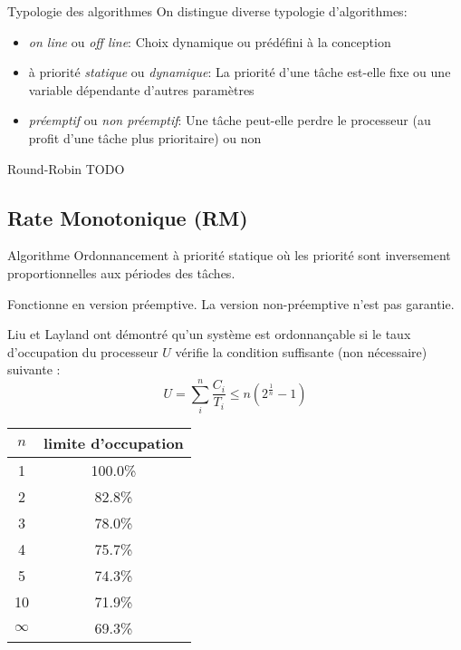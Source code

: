 \begin{frame}{Typologie des algorithmes}
  On distingue diverse typologie d'algorithmes:
  \begin{itemize}
  \item  \emph{on  line}  ou   \emph{off  line}:  Choix  dynamique  ou
    prédéfini à la conception
  \item  à priorité \emph{statique}  ou \emph{dynamique}:  La priorité
    d'une  tâche est-elle  fixe  ou une  variable dépendante  d'autres
    paramètres 
  \item \emph{préemptif} ou  \emph{non préemptif}: Une tâche peut-elle
    perdre le  processeur (au profit d'une tâche  plus prioritaire) ou
    non
  \end{itemize}
\end{frame}

\begin{frame}{Round-Robin}
TODO
\end{frame} 

\subsection{Rate Monotonique (RM)}

\begin{frame}{Algorithme}
  Ordonnancement à priorité statique où les priorité sont inversement
  proportionnelles aux périodes des tâches. 

  Fonctionne  en version préemptive.  La version  non-préemptive n'est
  pas garantie.

  Liu et Layland ont démontré qu'un système est ordonnançable si le
  taux d'occupation du processeur $U$ vérifie la condition suffisante
  (non nécessaire) suivante :
  $$U = \sum_i^n \frac{C_i}{T_i} \leq n \left(2^{\frac{1}{n}}-1\right)$$

  \begin{center}
    \begin{tabular}{cc}
      \hline
      $n$ & limite d'occupation \\
      \hline
      1 & 100.0\% \\
      2 & 82.8\% \\
      3 & 78.0\% \\
      4 & 75.7\% \\
      5 & 74.3\% \\
      10 & 71.9\% \\
      $\infty$ & 69.3\%\\
      \hline
    \end{tabular}
  \end{center}
\end{frame}


